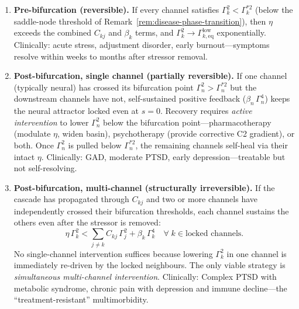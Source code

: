 \documentclass[aps,pre,twocolumn,superscriptaddress,floatfix]{revtex4-2}
\begin{document}
\begin{enumerate}
  \item \textbf{Pre-bifurcation (reversible).}
    If every channel satisfies
    $\Gamma_k^2 < \Gamma_k^{*2}$
    (below the saddle-node threshold of
    Remark~\ref{rem:disease-phase-transition}),
    then $\eta$ exceeds the combined
    $C_{kj}$ and $\beta_k$ terms, and
    $\Gamma_k^2 \to
    \Gamma_{k,\text{eq}}^{\text{low}}$
    exponentially.
    Clinically: acute stress, adjustment disorder,
    early burnout---symptoms resolve within weeks
    to months after stressor removal.

  \item \textbf{Post-bifurcation, single channel
    (partially reversible).}
    If one channel (typically neural) has crossed
    its bifurcation point
    $\Gamma_n^2 > \Gamma_n^{*2}$
    but the downstream channels have not,
    self-sustained positive feedback
    ($\beta_n\,\Gamma_n^4$) keeps the neural
    attractor locked even at $s = 0$.
    Recovery requires \emph{active intervention}
    to lower $\Gamma_n^2$ below the bifurcation
    point---pharmacotherapy (modulate $\eta$, widen
    basin), psychotherapy (provide corrective C2
    gradient), or both.
    Once $\Gamma_n^2$ is pulled below
    $\Gamma_n^{*2}$, the remaining channels
    self-heal via their intact $\eta$.
    Clinically: GAD, moderate PTSD, early
    depression---treatable but not self-resolving.

  \item \textbf{Post-bifurcation, multi-channel
    (structurally irreversible).}
    If the cascade has propagated through $C_{kj}$
    and two or more channels have independently
    crossed their bifurcation thresholds,
    each channel sustains the others even after
    the stressor is removed:
    \begin{equation}
      \eta\,\Gamma_k^2
      < \sum_{j \neq k} C_{kj}\,\Gamma_j^2
        + \beta_k\,\Gamma_k^4
      \quad \forall\; k \in
      \text{locked channels.}
      \label{eq:irreversible}
    \end{equation}
    No single-channel intervention suffices because
    lowering $\Gamma_k^2$ in one channel is
    immediately re-driven by the locked neighbours.
    The only viable strategy is \emph{simultaneous
    multi-channel intervention}.
    Clinically: Complex PTSD with metabolic
    syndrome, chronic pain with depression and
    immune decline---the ``treatment-resistant''
    multimorbidity.
\end{enumerate}
\end{document}
